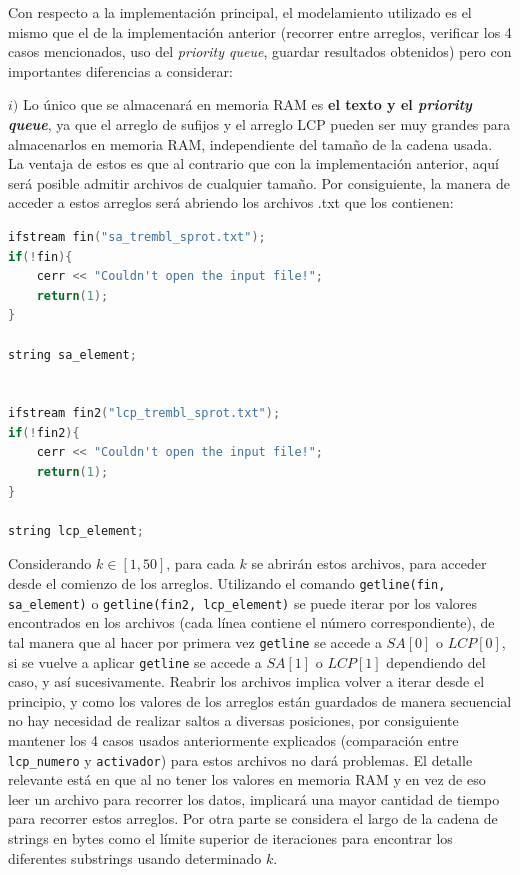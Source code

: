 Con respecto a la implementación principal, el modelamiento utilizado es el mismo que el de la implementación anterior (recorrer entre arreglos, verificar los 4 casos mencionados, uso del \textit{priority queue}, guardar resultados obtenidos) pero con importantes diferencias a considerar:

$i)$ Lo único que se almacenará en memoria RAM es \textbf{el texto y el \textit{priority queue}}, ya que el arreglo de sufijos y el arreglo LCP pueden ser muy grandes para almacenarlos en memoria RAM, independiente del tamaño de la cadena usada. La ventaja de estos es que al contrario que con la implementación anterior, aquí será posible admitir archivos de cualquier tamaño. Por consiguiente, la manera de acceder a estos arreglos será abriendo los archivos .txt que los contienen:

\begin{lstlisting}[language=C++, caption=Activación de archivos que contienen tanto el arreglo de sufijos como el arreglo LCP para un determinado texto]
ifstream fin("sa_trembl_sprot.txt");
if(!fin){
	cerr << "Couldn't open the input file!";
	return(1);
}

string sa_element;


ifstream fin2("lcp_trembl_sprot.txt");
if(!fin2){
	cerr << "Couldn't open the input file!";
	return(1);
}

string lcp_element;
\end{lstlisting}

Considerando $k \in [1,50]$, para cada $k$ se abrirán estos archivos, para acceder desde el comienzo de los arreglos.
Utilizando el comando \texttt{getline(fin, sa\_element)} o \texttt{getline(fin2, lcp\_element)} se puede iterar por los valores encontrados en los archivos (cada línea contiene el número correspondiente), de tal manera que al hacer por primera vez \texttt{getline} se accede a $SA[0]$ o $LCP[0]$, si se vuelve a aplicar \texttt{getline} se accede a $SA[1]$ o $LCP[1]$ dependiendo del caso, y así sucesivamente. Reabrir los archivos implica volver a iterar desde el principio, y como los valores de los arreglos están guardados de manera secuencial no hay necesidad de realizar saltos a diversas posiciones, por consiguiente mantener los 4 casos usados anteriormente explicados (comparación entre \texttt{lcp\_numero} y \texttt{activador}) para estos archivos no dará problemas. El detalle relevante está en que al no tener los valores en memoria RAM y en vez de eso leer un archivo para recorrer los datos, implicará una mayor cantidad de tiempo para recorrer estos arreglos. Por otra parte se considera el largo de la cadena de strings en bytes como el límite superior de iteraciones para encontrar los diferentes substrings usando determinado $k$.

